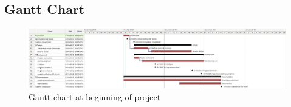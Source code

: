 \begin{appendices}


\newpage


\newpage

\begin{landscape}
\section{Gantt Chart}\label{sec:appendix_gantt}
\begin{figure}[th]
	\centering
	\includegraphics[height=0.45\textwidth, trim= 0 0 290pt 0, clip=true]{images/gantt-chart.jpg}
	\caption{Gantt chart at beginning of project}
\end{figure}
\end{landscape}
\newpage


\newpage


\newpage


\newpage


\newpage


\newpage



\end{appendices}
